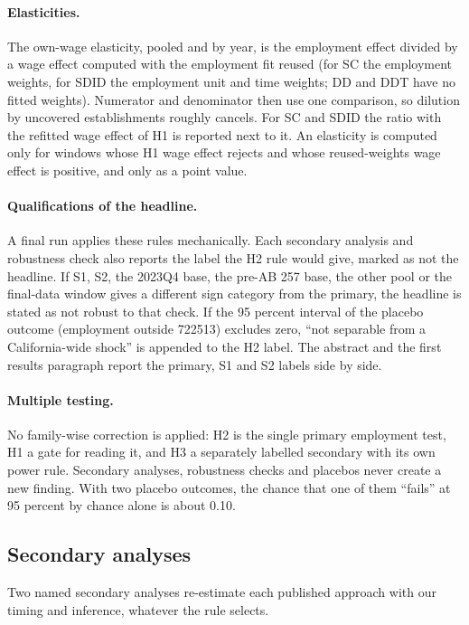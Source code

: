 \paragraph{Elasticities.} The own-wage elasticity, pooled and by year, is the employment effect
divided by a wage effect computed with the employment fit reused (for SC the employment weights, for
SDID the employment unit and time weights; DD and DDT have no fitted weights). Numerator and
denominator then use one comparison, so dilution by uncovered establishments roughly cancels. For
SC and SDID the ratio with the refitted wage effect of H1 is reported next to it. An elasticity is
computed only for windows whose H1 wage effect rejects and whose reused-weights wage effect is
positive, and only as a point value.

\paragraph{Qualifications of the headline.} A final run applies these rules mechanically. Each
secondary analysis and robustness check also reports the label the H2 rule would give, marked as
not the headline. If S1, S2, the 2023Q4 base, the pre-AB 257 base, the other pool or the
final-data window gives a different sign category from the primary, the headline is stated as not
robust to that check. If the 95 percent interval of the placebo outcome (employment outside 722513)
excludes zero, ``not separable from a California-wide shock'' is appended to the H2 label. The
abstract and the first results paragraph report the primary, S1 and S2 labels side by side.

\paragraph{Multiple testing.} No family-wise correction is applied: H2 is the single primary
employment test, H1 a gate for reading it, and H3 a separately labelled secondary with its own power
rule. Secondary analyses, robustness checks and placebos never create a new finding. With two
placebo outcomes, the chance that one of them ``fails'' at 95 percent by chance alone is about 0.10.

\subsection{Secondary analyses}
\label{sec:secondary}

Two named secondary analyses re-estimate each published approach with our timing and inference,
whatever the rule selects.

